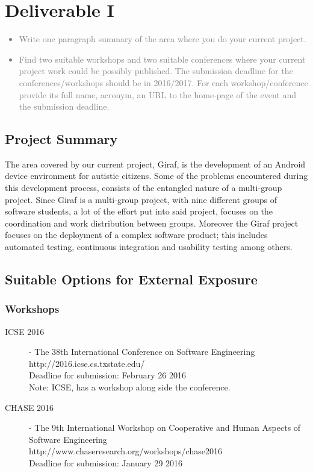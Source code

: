 \chapter{Deliverable I}
\textcolor{gray}{%
\begin{itemize}
    \item Write one paragraph summary of the area where you do your current project.
    \item Find two suitable workshops and two suitable conferences where your current project work could be possibly published. The submission deadline for the conferences/workshops should be in 2016/2017. For each workshop/conference provide its full name, acronym, an URL to the home-page of the event and the submission deadline.
\end{itemize}}
\section{Project Summary} %
\label{sec:project_summary}
The area covered by our current project, Giraf, is the development of an Android device environment for autistic citizens. 
Some of the problems encountered during this development process, consists of the entangled nature of a multi-group project. 
Since Giraf is a multi-group project, with nine different groups of software students, a lot of the effort put into said project, focuses on the coordination and work distribution between groups. 
Moreover the Giraf project focuses on the deployment of a complex software product; this includes automated testing, continuous integration and usability testing among others.

\section{Suitable Options for External Exposure}
\subsection{Workshops}
\begin{description}
    \item[ICSE 2016] - The 38th International Conference on Software Engineering \\
    http://2016.icse.cs.txstate.edu/ \\
Deadline for submission: February 26 2016 \\
Note: ICSE, has a workshop along side the conference.
    \item[CHASE 2016] - The 9th International Workshop on Cooperative and Human Aspects of Software Engineering \\
http://www.chaseresearch.org/workshops/chase2016 \\
Deadline for submission: January 29 2016
\end{description}             
